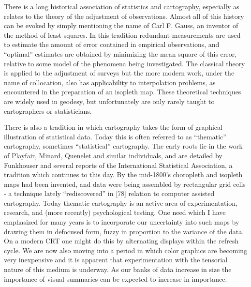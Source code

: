 \documentclass[a4paper,11pt]{article}
\begin{document}
\bigskip

There is a long historical association of statistics and cartography, especially as relates to the theory of the adjustment of observations. Almost all of this history can be evoked by simply mentioning the name of Carl F. Gauss, an inventor of the method of least squares. In this tradition redundant measurements are used to estimate the amount of error contained in empirical observations, and ``optimal'' estimates are obtained by minimizing the mean square of this error, relative to some model of the phenomena being investigated. The classical theory is applied to the adjustment of surveys but the more modern work, under the name of collocation, also has applicability to interpolation problems, as encountered in the preparation of an isopleth map. These theoretical techniques are widely used in geodesy, but unfortunately are only rarely taught to cartographers or statisticians.

\smallskip

There is also a tradition in which cartography takes the form of graphical illustration of statistical data. Today this is often referred to as ``thematic'' cartography, sometimes ``statistical'' cartography. The early roots lie in the work of Playfair, Minard, Quenelet and similar individuals, and are detailed by Funkhouser and several reports of the International Statistical Association, a tradition which continues to this day. By the mid-1800's choropleth and isopleth maps had been invented, and data were being assembled by rectangular grid cells - a technique lately ``rediscovered'' in [78] relation to computer assisted cartography. Today thematic cartography is an active area of experimentation, research, and (more recently) psychological testing. One need which I have emphasized for many years is to incorporate our uncertainty into such maps by drawing them in defocused form, fuzzy in proportion to the variance of the data. On a modern CRT one might do this by alternating displays within the refresh cycle. We are now also moving into a period in which color graphics are becoming very inexpensive and it is apparent that experimentation with the tensorial nature of this medium is underway. As our banks of data increase in size the importance of visual summaries can be expected to increase in importance.

\smallskip
\end{document}

